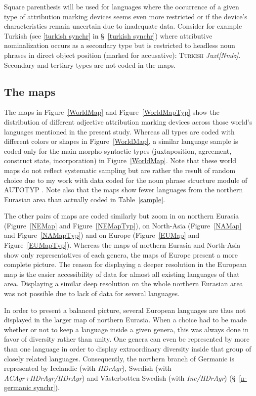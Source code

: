 Square parenthesis will be used for languages where the occurrence of a given type of attribution marking devices seems even more restricted or if the device's characteristics remain uncertain due to inadequate data. Consider for example Turkish (see \ref{turkish synchr} in \S~\ref{turkish synchr}) where attributive nominalization occurs as a secondary type but is restricted to headless noun phrases in direct object position (marked for accusative): \textsc{Turkish} \textit{Juxt[Nmlz]}. 
Secondary and tertiary types are not coded in the maps. 

\subsection{The maps}
The maps in Figure~\ref{WorldMap} and Figure~\ref{WorldMapTyp} show the distribution of different adjective attribution marking devices across those world's languages mentioned in the present study. Whereas all types are coded with different colors or shapes in Figure~\ref{WorldMap}, a similar language sample is coded only for the main morpho-syntactic types (juxtaposition, agreement, construct state, incorporation) in Figure~\ref{WorldMap}. Note that these world maps do not reflect systematic sampling but are rather the result of random choice due to my work with data coded for the noun phrase structure module of AUTOTYP \citep{AUTOTYP-NP}. Note also that the maps show fewer languages from the northern Eurasian area than actually coded in Table~\ref{sample}.

The other pairs of maps are coded similarly but zoom in on northern Eurasia (Figure~\ref{NEMap} and Figure~\ref{NEMapTyp}), on North-Asia (Figure~\ref{NAMap} and Figure~\ref{NAMapTyp}) and on Europe (Figure~\ref{EUMap} and Figure~\ref{EUMapTyp}). Whereas the maps of northern Eurasia and North-Asia show only representatives of each genera, the maps of Europe present a more complete picture. The reason for displaying a deeper resolution in the European map is the easier accessibility of data for almost all existing languages of that area. Displaying a similar deep resolution on the whole northern Eurasian area was not possible due to lack of data for several languages.

In order to present a balanced picture, several European languages are thus not displayed in the larger map of northern Eurasia. When a choice had to be made whether or not to keep a language inside a given genera, this was always done in favor of diversity rather than unity. One genera can even be represented by more than one language in order to display extraordinary diversity inside that group of closely related languages. Consequently, the northern branch of Germanic is represented by Icelandic (with \textit{HDrAgr}), Swedish (with \textit{ACAgr+HDrAgr/HDrAgr}) and Västerbotten Swedish (with \textit{Inc/HDrAgr}) (\S~\ref{n-germanic synchr}).

